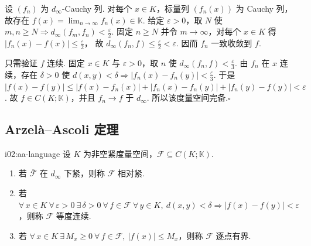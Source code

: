 \begin{FAProof}
设 \(\displaystyle (f_n)\) 为 \(\displaystyle d_\infty\)-Cauchy 列. 对每个 \(\displaystyle x\in K\)，标量列 \(\displaystyle (f_n(x))\) 为 Cauchy 列，故存在 \(\displaystyle f(x)=\lim_{n\to\infty}f_n(x)\in\mathbb K\). 给定 \(\displaystyle \varepsilon>0\)，取 \(\displaystyle N\) 使 \(\displaystyle m,n\geqslant N\Rightarrow d_\infty(f_m,f_n)<\frac{\varepsilon}{2}\). 固定 \(\displaystyle n\geqslant N\) 并令 \(\displaystyle m\to\infty\)，对每个 \(\displaystyle x\in K\) 得
\(\displaystyle |f_n(x)-f(x)|\leqslant\frac{\varepsilon}{2}\)，
故 \(\displaystyle d_\infty(f_n,f)\leqslant\frac{\varepsilon}{2}<\varepsilon\). 因而 \(\displaystyle f_n\) 一致收敛到 \(\displaystyle f\).

只需验证 \(\displaystyle f\) 连续. 固定 \(\displaystyle x\in K\) 与 \(\displaystyle \varepsilon>0\)，取 \(\displaystyle n\) 使 \(\displaystyle d_\infty(f_n,f)<\frac{\varepsilon}{3}\). 由 \(\displaystyle f_n\) 在 \(\displaystyle x\) 连续，存在 \(\displaystyle \delta>0\) 使 \(\displaystyle d(x,y)<\delta\Rightarrow |f_n(x)-f_n(y)|<\frac{\varepsilon}{3}\). 于是 \(\displaystyle |f(x)-f(y)| \leqslant |f(x)-f_n(x)|+|f_n(x)-f_n(y)|+|f_n(y)-f(y)|<\varepsilon\).
故 \(\displaystyle f\in C(K;\mathbb K)\)，并且 \(\displaystyle f_n\to f\) 于 \(\displaystyle d_\infty\). 所以该度量空间完备.\hfill\(\square\)
\end{FAProof}

\subsection{Arzelà--Ascoli 定理}

\begin{FADefinition}{i02:aa-language}
设 \(\displaystyle K\) 为非空紧度量空间，\(\displaystyle \mathcal F\subseteq C(K;\mathbb K)\).
\begin{enumerate}[label=\textup{(\roman*)}]
\item 若 \(\displaystyle \overline{\mathcal F}\) 在 \(\displaystyle d_\infty\) 下紧，则称 \(\displaystyle \mathcal F\) 相对紧.
\item 若 \(\displaystyle \forall\,x\in K\ \forall\,\varepsilon>0\ \exists\,\delta>0\ \forall\,f\in\mathcal F\ \forall\,y\in K,\ d(x,y)<\delta\Rightarrow |f(x)-f(y)|<\varepsilon\)，则称 \(\displaystyle \mathcal F\) 等度连续.
\item 若 \(\displaystyle \forall\,x\in K\ \exists\,M_x\geqslant0\ \forall\,f\in\mathcal F,\ |f(x)|\leqslant M_x\)，则称 \(\displaystyle \mathcal F\) 逐点有界.
\end{enumerate}
\end{FADefinition}

